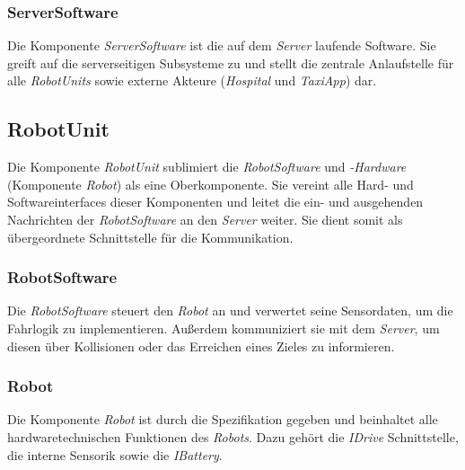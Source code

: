 \subsubsection{ServerSoftware}

Die Komponente \emph{ServerSoftware} ist die auf dem \emph{Server} laufende Software. 
Sie greift auf die serverseitigen Subsysteme zu und stellt die zentrale Anlaufstelle f\"{u}r alle \emph{RobotUnits} sowie externe Akteure (\emph{Hospital} und \emph{TaxiApp}) dar.

\subsection{RobotUnit}

Die Komponente \emph{RobotUnit} sublimiert die \emph{RobotSoftware} und \emph{-Hardware} (Komponente \emph{Robot}) als eine Oberkomponente. 
Sie vereint alle Hard- und Softwareinterfaces dieser Komponenten und leitet die ein- und ausgehenden Nachrichten der \emph{RobotSoftware} an den \emph{Server} weiter. 
Sie dient somit als \"{u}bergeordnete Schnittstelle f\"{u}r die Kommunikation.

\subsubsection{RobotSoftware}

Die \emph{RobotSoftware} steuert den \emph{Robot} an und verwertet seine Sensordaten, um die Fahrlogik zu implementieren. Außerdem kommuniziert sie mit dem \emph{Server}, um diesen über Kollisionen oder das Erreichen eines Zieles zu informieren.

\subsubsection{Robot}

Die Komponente \emph{Robot} ist durch die Spezifikation gegeben und beinhaltet alle hardwaretechnischen Funktionen des \emph{Robots}. 
Dazu geh\"{o}rt die \emph{IDrive} Schnittstelle, die interne Sensorik sowie die \emph{IBattery}.
